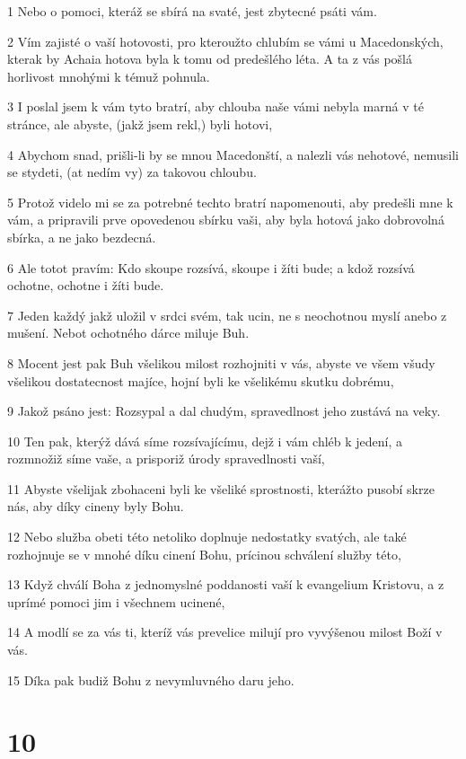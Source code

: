 \par 1 Nebo o pomoci, kteráž se sbírá na svaté, jest zbytecné psáti vám.
\par 2 Vím zajisté o vaší hotovosti, pro kteroužto chlubím se vámi u Macedonských, kterak by Achaia hotova byla k tomu od predešlého léta. A ta z vás pošlá horlivost mnohými k témuž pohnula.
\par 3 I poslal jsem k vám tyto bratrí, aby chlouba naše vámi nebyla marná v té stránce, ale abyste, (jakž jsem rekl,) byli hotovi,
\par 4 Abychom snad, prišli-li by se mnou Macedonští, a nalezli vás nehotové, nemusili se stydeti, (at nedím vy) za takovou chloubu.
\par 5 Protož videlo mi se za potrebné techto bratrí napomenouti, aby predešli mne k vám, a pripravili prve opovedenou sbírku vaši, aby byla hotová jako dobrovolná sbírka, a ne jako bezdecná.
\par 6 Ale totot pravím: Kdo skoupe rozsívá, skoupe i žíti bude; a kdož rozsívá ochotne, ochotne i žíti bude.
\par 7 Jeden každý jakž uložil v srdci svém, tak ucin, ne s neochotnou myslí anebo z mušení. Nebot ochotného dárce miluje Buh.
\par 8 Mocent jest pak Buh všelikou milost rozhojniti v vás, abyste ve všem všudy všelikou dostatecnost majíce, hojní byli ke všelikému skutku dobrému,
\par 9 Jakož psáno jest: Rozsypal a dal chudým, spravedlnost jeho zustává na veky.
\par 10 Ten pak, kterýž dává síme rozsívajícímu, dejž i vám chléb k jedení, a rozmnožiž síme vaše, a prisporiž úrody spravedlnosti vaší,
\par 11 Abyste všelijak zbohaceni byli ke všeliké sprostnosti, kterážto pusobí skrze nás, aby díky cineny byly Bohu.
\par 12 Nebo služba obeti této netoliko doplnuje nedostatky svatých, ale také rozhojnuje se v mnohé díku cinení Bohu, prícinou schválení služby této,
\par 13 Když chválí Boha z jednomyslné poddanosti vaší k evangelium Kristovu, a z uprímé pomoci jim i všechnem ucinené,
\par 14 A modlí se za vás ti, kteríž vás prevelice milují pro vyvýšenou milost Boží v vás.
\par 15 Díka pak budiž Bohu z nevymluvného daru jeho.

\chapter{10}

